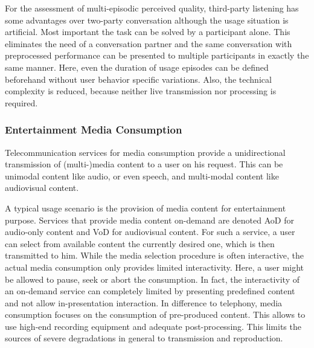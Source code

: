 For the assessment of multi-episodic perceived quality, third-party listening has some advantages over two-party conversation although the usage situation is artificial.
Most important the task can be solved by a participant alone.
This eliminates the need of a conversation partner and the same conversation with preprocessed performance can be presented to multiple participants in exactly the same manner.
Here, even the duration of usage episodes can be defined beforehand without user behavior specific variations.
Also, the technical complexity is reduced, because neither live transmission nor processing is required.

\subsubsection{Entertainment Media Consumption}
Telecommunication services for media consumption provide a unidirectional transmission of (multi-)media content to a user on his request.
This can be unimodal content like audio, or even speech, and multi-modal content like audiovisual content.

A typical usage scenario is the provision of media content for entertainment purpose.
Services that provide media content on-demand are denoted \ac{AoD} for audio-only content and \ac{VoD} for audiovisual content.
For such a service, a user can select from available content the currently desired one, which is then transmitted to him.
While the media selection procedure is often interactive, the actual media consumption only provides limited interactivity.
Here, a user might be allowed to pause, seek or abort the consumption.
In fact, the interactivity of an on-demand service can completely limited by presenting predefined content and not allow in-presentation interaction.
In difference to telephony, media consumption focuses on the consumption of pre-produced content.
This allows to use high-end recording equipment and adequate post-processing. %
This limits the sources of severe degradations in general to transmission and reproduction.

